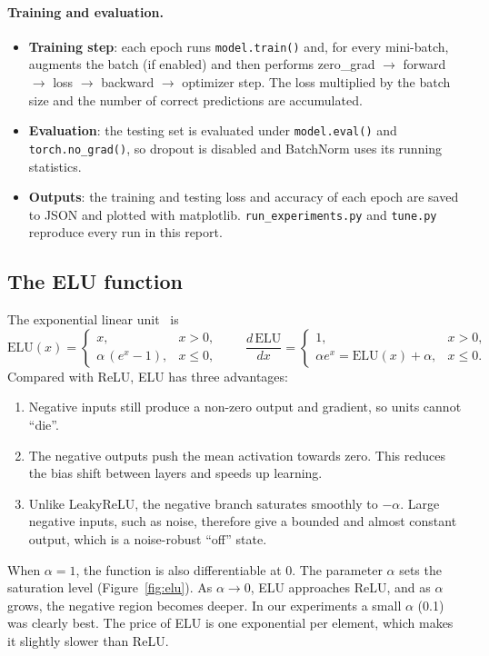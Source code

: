 \documentclass[11pt,a4paper]{article}
\begin{document}
\paragraph{Training and evaluation.}
\begin{itemize}
  \item \textbf{Training step}: each epoch runs \texttt{model.train()} and, for every mini-batch, augments the batch (if enabled) and then performs zero\_grad $\to$ forward $\to$ loss $\to$ backward $\to$ optimizer step. The loss multiplied by the batch size and the number of correct predictions are accumulated.
  \item \textbf{Evaluation}: the testing set is evaluated under \texttt{model.eval()} and \texttt{torch.no\_grad()}, so dropout is disabled and BatchNorm uses its running statistics.
  \item \textbf{Outputs}: the training and testing loss and accuracy of each epoch are saved to JSON and plotted with matplotlib. \texttt{run\_experiments.py} and \texttt{tune.py} reproduce every run in this report.
\end{itemize}

\subsection{The ELU function}

The exponential linear unit~\cite{elu} is
\begin{equation}
\mathrm{ELU}(x)=\begin{cases} x, & x>0,\\ \alpha\,(e^{x}-1), & x\le 0,\end{cases}
\qquad
\frac{d\,\mathrm{ELU}}{dx}=\begin{cases} 1, & x>0,\\ \alpha e^{x}=\mathrm{ELU}(x)+\alpha, & x\le0.\end{cases}
\end{equation}
Compared with ReLU, ELU has three advantages:
\begin{enumerate}
  \item Negative inputs still produce a non-zero output and gradient, so units cannot ``die''.
  \item The negative outputs push the mean activation towards zero. This reduces the bias shift between layers and speeds up learning.
  \item Unlike LeakyReLU, the negative branch saturates smoothly to $-\alpha$. Large negative inputs, such as noise, therefore give a bounded and almost constant output, which is a noise-robust ``off'' state.
\end{enumerate}
When $\alpha=1$, the function is also differentiable at 0. The parameter $\alpha$ sets the saturation level (Figure~\ref{fig:elu}). As $\alpha\to0$, ELU approaches ReLU, and as $\alpha$ grows, the negative region becomes deeper. In our experiments a small $\alpha$ (0.1) was clearly best. The price of ELU is one exponential per element, which makes it slightly slower than ReLU.
\end{document}
